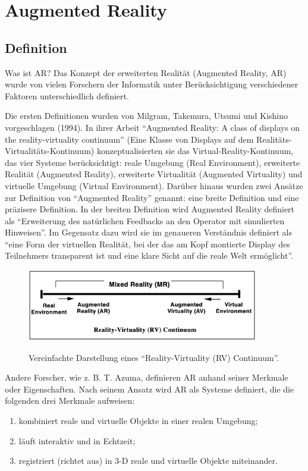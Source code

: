 \section{Augmented Reality}


\subsection {Definition}

Was ist AR?
Das Konzept der erweiterten Realität (Augmented Reality, AR) wurde von vielen Forschern der Informatik unter Berücksichtigung verschiedener Faktoren unterschiedlich definiert.

Die ersten Definitionen wurden von Milgram, Takemura, Utsumi und Kishino vorgeschlagen
(1994). In ihrer Arbeit “Augmented Reality: A class of displays on the reality-virtuality continuum” (Eine Klasse von Displays auf dem Realitäts-Virtualitäts-Kontinuum) konzeptualisierten sie das Virtual-Reality-Kontinuum, das vier Systeme berücksichtigt: reale Umgebung (Real Environment), erweiterte Realität (Augmented Reality), erweiterte Virtualität (Augmented Virtuality) und virtuelle Umgebung (Virtual Environment). Darüber hinaus wurden zwei Ansätze zur Definition von “Augmented Reality” genannt: eine breite Definition und eine präzisere Definition. In der breiten Definition wird Augmented Reality definiert als “Erweiterung des natürlichen Feedbacks an den Operator mit simulierten Hinweisen”. Im Gegensatz dazu wird sie im genaueren Verständnis definiert als “eine Form der virtuellen Realität, bei der das am Kopf montierte Display des Teilnehmers transparent ist und eine klare Sicht auf die reale Welt ermöglicht”.  \cite{Milgram94a} \cite{Milgram94b}
\vspace{1cm}
\begin{figure}[h!]
    \centering
    \includegraphics[width=0.9\textwidth]{attachments/MR_Definition.png}
    \caption{Vereinfachte Darstellung eines “Reality-Virtuality (RV) Continuum”.}  \cite{Milgram94a}
    \end{figure}
    

    \newpage

Andere Forscher, wie z. B. T. Azuma, definieren AR anhand seiner Merkmale oder Eigenschaften. Nach seinem Ansatz wird AR als Systeme definiert, die die folgenden drei Merkmale aufweisen:
\begin{enumerate}
    \item kombiniert reale und virtuelle Objekte in einer realen Umgebung;
    \item läuft interaktiv und in Echtzeit;
    \item registriert (richtet aus) in 3-D reale und virtuelle Objekte miteinander.  \cite{Azuma1997ASO}
\end{enumerate}


